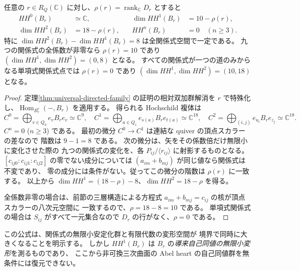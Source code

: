\begin{theorem}
\label{thm:aou-hh-support}
任意の $r\in R_Q(\mathbb C)$ に対し、$\rho(r)=\operatorname{rank}_{\mathbb C}D_r$ とすると
\[
\begin{aligned}
 HH^0(B_r)&\simeq\mathbb C,&\quad \dim HH^1(B_r)&=10-\rho(r),\\
 \dim HH^2(B_r)&=18-\rho(r),&\quad HH^n(B_r)&=0\quad(n\ge3).
\end{aligned}
\]
特に $\dim HH^2(B_r)-\dim HH^1(B_r)=8$ は全関係式空間で一定である。
九つの関係式の全係数が非零なら $\rho(r)=10$ であり
$(\dim HH^1,\dim HH^2)=(0,8)$ となる。
すべての関係式が一つの道のみからなる単項式関係式点では
$\rho(r)=0$ であり $(\dim HH^1,\dim HH^2)=(10,18)$ となる。
\end{theorem}
\begin{proof}
定理\ref{thm:universal-directed-family} の証明の相対双加群解消を
$r$ で特殊化し、$\operatorname{Hom}_{B_r^e}(-,B_r)$ を適用する。
得られる Hochschild 複体は
\[
 C^0=\bigoplus_{v\in Q_0}e_vB_re_v\simeq\mathbb C^9,
 \quad C^1=\bigoplus_{a\in Q_1}e_{s(a)}B_re_{t(a)}\simeq\mathbb C^{18},
 \quad C^2=\bigoplus_{(i,j)}e_{u_i}B_re_{z_j}\simeq\mathbb C^{18}.
\]
$C^n=0$ ($n\ge3$) である。
最初の微分 $C^0\to C^1$ は連結な quiver の頂点スカラーの差なので
階数は $9-1=8$ である。
次の微分は、矢をその係数倍だけ無限小に変化させた際の
九つの関係式の変化を、各 $P_{ij}/\langle r_{ij}\rangle$ に射影するものとなる。
$[c_{ij0}:c_{ij1}:c_{ij2}]$ の零でない成分については
$(a_{im}+b_{mj})$ が同じ値なら関係式は不変であり、
零の成分には条件がない。従ってこの微分の階数は
$\rho(r)$ に一致する。
以上から
$\dim HH^1=(18-\rho)-8$、$\dim HH^2=18-\rho$ を得る。

全係数非零の場合は、前節の三層構造による方程式
$a_{im}+b_{mj}=c_{ij}$ の核が頂点スカラーの八次元空間に
一致するので、$\rho=18-8=10$ である。
単項式関係式の場合は $S_{ij}$ がすべて一元集合なので
$D_r$ の行がなく、$\rho=0$ である。
\end{proof}

\begin{remark}[境界で跳ぶのは何か]
この公式は、関係式の無限小安定化群と有限代数の変形空間が
境界で同時に大きくなることを明示する。
しかし $HH^1(B_r)$ は $B_r$ の\emph{導来自己同値の無限小変形}を測るものであり、
ここから非可換三次曲面の Abel heart の自己同値群を無条件には復元できない。
\end{remark}

